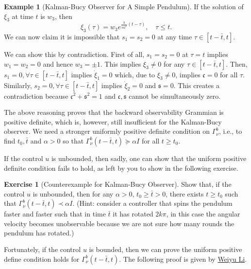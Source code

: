 \documentclass[
]{book}
\theoremstyle{definition}
\theoremstyle{definition}
\newtheorem{example}{Example}[chapter]
\theoremstyle{definition}
\newtheorem{exercise}{Exercise}[chapter]
\theoremstyle{definition}
\theoremstyle{remark}
\begin{document}
\begin{example}[Kalman-Bucy Observer for A Simple Pendulum]
If the solution of \(\xi_3\) at time \(t\) is \(w_3\), then
\[
\xi_3(\tau) = w_3 e^{\frac{b}{ml^2}(t - \tau)}, \quad \tau \leq t.
\]
We can now claim it is impossible that \(s_1 = s_2 = 0\) at any time \(\tau \in [t - \bar{t}, t]\).

We can show this by contradiction. First of all, \(s_1 = s_2 = 0\) at \(\tau = t\) implies \(w_1 = w_2 = 0\) and hence \(w_3 = \pm 1\). This implies \(\xi_3 \neq 0\) for any \(\tau \in [t - \bar{t}, t]\). Then, \(s_1 = 0, \forall \tau \in [t - \bar{t}, t]\) implies \(\dot{\xi}_1 = 0\) which, due to \(\xi_3 \neq 0\), implies \(\mathfrak{c} = 0\) for all \(\tau\). Similarly, \(s_2 = 0, \forall \tau \in [t - \bar{t}, t]\) implies \(\dot{\xi}_2 = 0\) and \(\mathfrak{s} = 0\). This creates a contradiction because \(\mathfrak{c}^2 + \mathfrak{s}^2 = 1\) and \(\mathfrak{c}, \mathfrak{s}\) cannot be simultaneously zero.

The above reasoning proves that the backward observability Grammian is positive definite, which is, however, still insufficient for the Kalman-Bucy observer. We need a stronger uniformly positive definite condition on \(\Gamma_\nu^b\), i.e., to find \(t_0, \bar{t}\) and \(\alpha>0\) so that \(\Gamma_\nu^b(t-\bar{t},t) \succeq \alpha I\) for all \(t \geq t_0\).

If the control \(u\) is unbounded, then sadly, one can show that the uniform positive definite condition fails to hold, as left by you to show in the following exercise.

\begin{exercise}[Counterexample for Kalman-Bucy Observer]
\protect\hypertarget{exr:kbobserverpendulumcounterexample}{}\label{exr:kbobserverpendulumcounterexample}Show that, if the control \(u\) is unbounded, then for any \(\alpha > 0\), \(t_0 \geq \bar{t} > 0\), there exists \(t \geq t_0\) such that \(\Gamma_\nu^b(t - \bar{t},t) \prec \alpha I\). (Hint: consider a controller that spins the pendulum faster and faster such that in time \(\bar{t}\) it has rotated \(2k\pi\), in this case the angular velocity becomes unobservable because we are not sure how many rounds the pendulum has rotated.)
\end{exercise}

Fortunately, if the control \(u\) is bounded, then we can prove the uniform positive define condition holds for \(\Gamma_\nu^b(t - \bar{t},t)\). The following proof is given by \href{https://scholar.harvard.edu/weiyuli/home}{Weiyu Li}.


\end{example}
\end{document}
